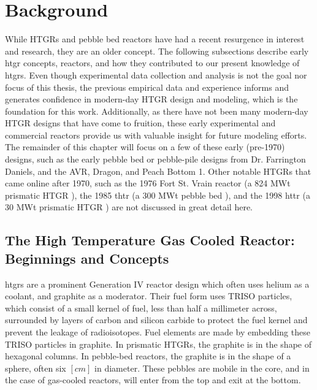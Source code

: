 \section{Background}
\label{sec:intro-background}

While HTGRs and pebble bed reactors have had a recent resurgence in interest and research, they are an older concept.  The following subsections describe early \acrshort{htgr} concepts, reactors, and how they contributed to our present knowledge of \acrshort{htgr}s.  Even though experimental data collection and analysis is not the goal nor focus of this thesis, the previous empirical data and experience informs and generates confidence in modern-day HTGR design and modeling, which is the foundation for this work.  Additionally, as there have not been many modern-day HTGR designs that have come to fruition, these early experimental and commercial reactors provide us with valuable insight for future modeling efforts.  The remainder of this chapter will focus on a few of these early (pre-1970) designs, such as the early pebble bed or pebble-pile designs from Dr. Farrington Daniels, and the AVR, Dragon, and Peach Bottom 1.  Other notable HTGRs that came online after 1970, such as the 1976 Fort St. Vrain reactor (a 824 MWt prismatic HTGR \cite{walker_experience_1978}), the 1985 \acrfull{thtr} (a 300 MWt pebble bed \cite{baumer_construction_1990}), and the 1998 \acrfull{httr} (a 30 MWt prismatic HTGR \cite{shiozawa_overview_2004}) are not discussed in great detail here.

\subsection{The High Temperature Gas Cooled Reactor: Beginnings and Concepts}

\acrshort{htgr}s are a prominent Generation IV reactor design which often uses helium as a coolant, and graphite as a moderator.  Their fuel form uses TRISO particles, which consist of a small kernel of fuel, less than half a millimeter across, surrounded by layers of carbon and silicon carbide to protect the fuel kernel and prevent the leakage of radioisotopes.  Fuel elements are made by embedding these TRISO particles in graphite.  In prismatic HTGRs, the graphite is in the shape of hexagonal columns.  In pebble-bed reactors, the graphite is in the shape of a sphere, often six $\left[cm\right]$ in diameter.  These pebbles are mobile in the core, and in the case of gas-cooled reactors, will enter from the top and exit at the bottom.

